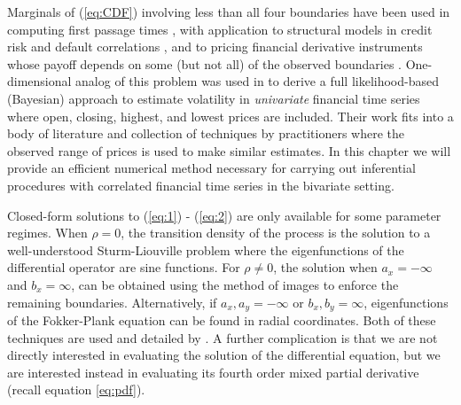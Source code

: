 Marginals of (\ref{eq:CDF}) involving less than all four boundaries
have been used in computing first passage times \citep{kou2016first,
  sacerdote2016first}, with application to structural models in credit
risk and default correlations \citep{haworth2008modelling,
  ching2014correlated}, and to pricing financial derivative instruments
whose payoff depends on some (but not all) of the observed boundaries
\citep{he1998double}. One-dimensional analog of this problem was used
in \cite{rodriguez2012} to derive a full likelihood-based (Bayesian)
approach to estimate volatility in \textit{univariate} financial
time series where open, closing, highest, and lowest prices are
included. Their work fits into a body of literature and collection of
techniques by practitioners where the observed range of prices is used
to make similar estimates. In this chapter we will provide an
efficient numerical method necessary for carrying out inferential
procedures with correlated financial time series in the bivariate
setting.

Closed-form solutions to (\ref{eq:1}) - (\ref{eq:2}) are only
available for some parameter regimes. When $\rho = 0$, the transition
density of the process is the solution to a well-understood
Sturm-Liouville problem where the eigenfunctions of the differential
operator are sine functions. For $\rho \ne 0$, the solution when
$a_x = -\infty$ and $b_x = \infty$, can be obtained using the method
of images to enforce the remaining boundaries. Alternatively, if
$a_x, a_y = -\infty$ or $b_x, b_y = \infty$, eigenfunctions of the
Fokker-Plank equation can be found in radial coordinates. Both of
these techniques are used and detailed by \cite{he1998double}. A
further complication is that we are not directly interested in
evaluating the solution of the differential equation,
but we are interested instead in evaluating its fourth order mixed
partial derivative (recall equation \eqref{eq:pdf}).


